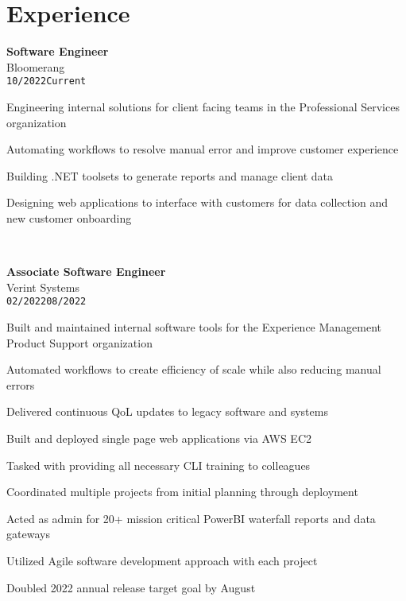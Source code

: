 \documentclass[10pt]{article}
\newenvironment{itemize*}%
  {\begin{itemize}[leftmargin=*,label=\faChevronRight]%
    \setlength{\itemsep}{0pt}%
    \setlength{\parskip}{0pt}%
    \setlength{\parsep}{0pt}}%
  {\end{itemize}}
\newcommand\workexp[5]{
    \begin{minipage}[t]{0.215\textwidth}
            \raggedleft
                \textbf{\fontsize{13}{10}\selectfont #1}\\ 
                #2\\
                \small\texttt{#3}\textendash \texttt{#4}
    \end{minipage}\hspace*{5pt}%
    \begin{minipage}[t]{0.75\textwidth}
        \raggedright
        \fontsize{10}{10}\selectfont#5
    \end{minipage}
}
\begin{document}
\section*{Experience}
\vspace*{-10pt}\workexp{Software Engineer}{Bloomerang}{10/2022}{Current}{%
    \begin{itemize*}
        \item Engineering internal solutions for client facing teams in the Professional Services organization
        \item Automating workflows to resolve manual error and improve customer experience
        \item Building .NET toolsets to generate reports and manage client data
        \item Designing web applications to interface with customers for data collection and new customer onboarding
    \end{itemize*}%
}
\vspace*{10pt}\\
\workexp{Associate Software Engineer}{Verint Systems}{02/2022}{08/2022}{%
\begin{itemize*}
    \item Built and maintained internal software tools for the Experience Management Product Support organization
    \item Automated workflows to create efficiency of scale while also reducing manual errors
    \item Delivered continuous QoL updates to legacy software and systems
    \item Built and deployed single page web applications via AWS EC2
    \item Tasked with providing all necessary CLI training to colleagues
    \item Coordinated multiple projects from initial planning through deployment
    \item Acted as admin for 20+ mission critical PowerBI waterfall reports and data gateways
    \item Utilized Agile software development approach with each project
    \item Doubled 2022 annual release target goal by August
\end{itemize*}%
}
\vspace*{10pt}\\
\end{document}
